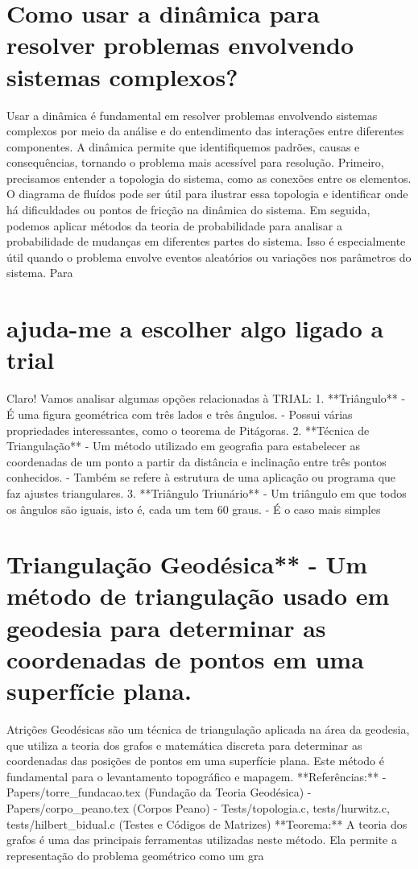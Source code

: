 \documentclass[11pt,a4paper]{article}
\begin{document}
\section{Como usar a dinâmica para resolver problemas envolvendo sistemas complexos?}
Usar a dinâmica é fundamental em resolver problemas envolvendo sistemas complexos por meio da análise e do entendimento das interações entre diferentes componentes. A dinâmica permite que identifiquemos padrões, causas e consequências, tornando o problema mais acessível para resolução. Primeiro, precisamos entender a topologia do sistema, como as conexões entre os elementos. O diagrama de fluídos pode ser útil para ilustrar essa topologia e identificar onde há dificuldades ou pontos de fricção na dinâmica do sistema. Em seguida, podemos aplicar métodos da teoria de probabilidade para analisar a probabilidade de mudanças em diferentes partes do sistema. Isso é especialmente útil quando o problema envolve eventos aleatórios ou variações nos parâmetros do sistema. Para

\section{ajuda-me a escolher algo ligado a trial}
Claro! Vamos analisar algumas opções relacionadas à TRIAL: 1. **Triângulo** - É uma figura geométrica com três lados e três ângulos. - Possui várias propriedades interessantes, como o teorema de Pitágoras. 2. **Técnica de Triangulação** - Um método utilizado em geografia para estabelecer as coordenadas de um ponto a partir da distância e inclinação entre três pontos conhecidos. - Também se refere à estrutura de uma aplicação ou programa que faz ajustes triangulares. 3. **Triângulo Triunário** - Um triângulo em que todos os ângulos são iguais, isto é, cada um tem 60 graus. - É o caso mais simples

\section{Triangulação Geodésica** - Um método de triangulação usado em geodesia para determinar as coordenadas de pontos em uma superfície plana.}
Atrições Geodésicas são um técnica de triangulação aplicada na área da geodesia, que utiliza a teoria dos grafos e matemática discreta para determinar as coordenadas das posições de pontos em uma superfície plana. Este método é fundamental para o levantamento topográfico e mapagem. **Referências:** - Papers/torre\_fundacao.tex (Fundação da Teoria Geodésica) - Papers/corpo\_peano.tex (Corpos Peano) - Tests/topologia.c, tests/hurwitz.c, tests/hilbert\_bidual.c (Testes e Códigos de Matrizes) **Teorema:** A teoria dos grafos é uma das principais ferramentas utilizadas neste método. Ela permite a representação do problema geométrico como um gra
\end{document}
